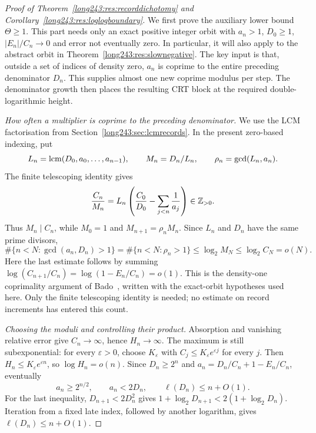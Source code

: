 \documentclass[11pt]{article}
\begin{document}
\begin{proof}[Proof of Theorem~\ref{long243:res:recorddichotomy} and
Corollary~\ref{long243:res:loglogboundary}]
We first prove the auxiliary lower bound $\Theta\ge1$. This part needs
only an exact positive integer orbit with $a_n>1$, $D_0\ge1$,
$|E_n|/C_n\to0$ and error not eventually zero. In particular, it will also
apply to the abstract orbit in Theorem~\ref{long243:res:slownegative}.
The key input is that, outside a set of indices of density zero,
$a_n$ is coprime to the entire preceding denominator $D_n$. This supplies
almost one new coprime modulus per step. The denominator growth then
places the resulting CRT block at the required double-logarithmic height.

\emph{How often a multiplier is coprime to the preceding denominator.}
We use the LCM factorisation from
Section~\ref{long243:sec:lcmrecords}. In the present zero-based indexing, put
\[
 L_n=\operatorname{lcm}(D_0,a_0,\ldots,a_{n-1}),\qquad
 M_n=D_n/L_n,\qquad \rho_n=\gcd(L_n,a_n).
\]
The finite telescoping identity gives
\[
 \frac{C_n}{M_n}
 =L_n\left(\frac{C_0}{D_0}-\sum_{j<n}\frac1{a_j}\right)
 \in\mathbb{Z}_{>0}.
\]
Thus $M_n\mid C_n$, while $M_0=1$ and
$M_{n+1}=\rho_nM_n$. Since $L_n$ and $D_n$ have the same prime divisors,
\[
 \#\{n<N:\gcd(a_n,D_n)>1\}
 =\#\{n<N:\rho_n>1\}
 \le\log_2M_N\le\log_2C_N=o(N).
\]
Here the last estimate follows by summing
$\log(C_{n+1}/C_n)=\log(1-E_n/C_n)=o(1)$.
This is the density-one coprimality argument of
Bado~\cite[Theorem~9.1, p.~7]{bado2026}, written with the exact-orbit
hypotheses used here. Only the finite telescoping identity is needed;
no estimate on record increments has entered this count.

\emph{Choosing the moduli and controlling their product.}
Absorption and vanishing relative error give $C_n\to\infty$, hence
$H_n\to\infty$. The maximum is still subexponential: for every
$\varepsilon>0$, choose $K_\varepsilon$ with
$C_j\le K_\varepsilon e^{\varepsilon j}$ for every $j$. Then
$H_n\le K_\varepsilon e^{\varepsilon n}$, so $\log H_n=o(n)$.
Since $D_n\ge2^n$ and
$a_n=D_n/C_n+1-E_n/C_n$, eventually
\[
 a_n\ge2^{n/2},\qquad a_n<2D_n,\qquad \ell(D_n)\le n+O(1).
\]
For the last inequality, $D_{n+1}<2D_n^2$ gives
$1+\log_2D_{n+1}<2(1+\log_2D_n)$. Iteration from a fixed late index,
followed by another logarithm, gives $\ell(D_n)\le n+O(1)$.


\end{proof}
\end{document}
